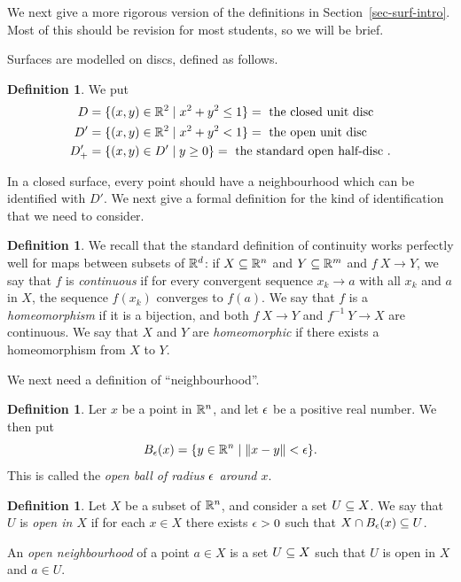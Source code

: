 \documentclass[reqno]{amsart}
\theoremstyle{definition}
\newtheorem{definition}[theorem]{Definition}
\begin{document}
We next give a more rigorous version of the definitions in
Section~\ref{sec-surf-intro}.  Most of this should be revision for
most students, so we will be brief.

Surfaces are modelled on discs, defined as follows.

\begin{definition}
 We put 
 \begin{align*}
  D   &= \{(x,y)\in\mathbb{R}^2\;|\; x^2+y^2 \leq 1\} 
       = \text{ the closed unit disc } \\
  D' &= \{(x,y)\in\mathbb{R}^2\;|\; x^2+y^2 < 1\} 
       = \text{ the open unit disc } \\
  D'_+ &= \{(x,y)\in D'\;|\; y\geq 0\} 
       = \text{ the standard open half-disc }.
 \end{align*}
\end{definition}

In a closed surface, every point should have a neighbourhood which can
be identified with $D'$.  We next give a formal definition for the kind
of identification that we need to consider.

\begin{definition}
 We recall that the standard definition of continuity works perfectly
 well for maps between subsets of $\mathbb{R}^d$: if $X\subseteq\mathbb{R}^n$ and
 $Y\subseteq\mathbb{R}^m$ and $f\:X\to Y$, we say that $f$ is \emph{continuous} if 
 for every convergent sequence $x_k\to a$ with all $x_k$ and $a$ in
 $X$, the sequence $f(x_k)$ converges to $f(a)$.  We say that $f$ is a
 \emph{homeomorphism} if it is a bijection, and both $f\:X\to Y$ and
 $f^{-1}\:Y\to X$ are continuous.  We say that $X$ and $Y$ are
 \emph{homeomorphic} if there exists a homeomorphism from $X$ to $Y$.
\end{definition}

We next need a definition of ``neighbourhood''.
\begin{definition}
 Ler $x$ be a point in $\mathbb{R}^n$, and let $\epsilon$ be a positive real
 number.  We then put 
 \[ B_\epsilon(x) = \{y\in\mathbb{R}^n\;|\; \|x-y\|<\epsilon\}. \]
 This is called the \emph{open ball of radius $\epsilon$ around $x$}.
\end{definition}

\begin{definition}
 Let $X$ be a subset of $\mathbb{R}^n$, and consider a set $U\subseteq X$.  We say
 that $U$ is \emph{open in $X$} if for each $x\in X$ there exists
 $\epsilon>0$ such that $X\cap B_{\epsilon}(x)\subseteq U$.

 An \emph{open neighbourhood} of a point $a\in X$ is a set $U\subseteq X$
 such that $U$ is open in $X$ and $a\in U$.
\end{definition}
\end{document}
